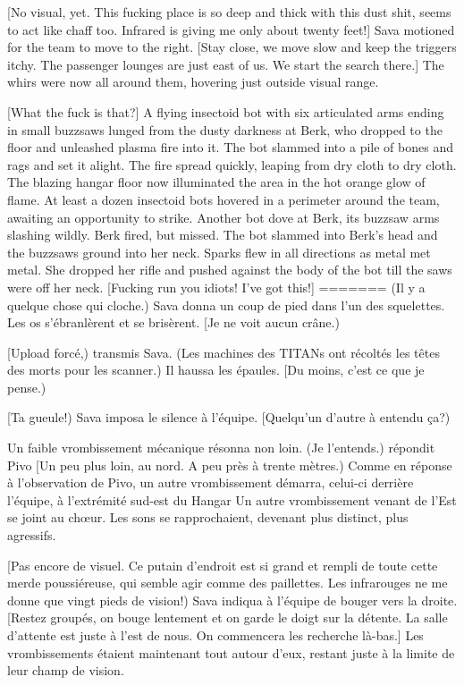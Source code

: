[No visual, yet. This fucking place is so deep and thick with this dust shit, seems to act like chaff too. Infrared is giving me only about twenty feet!] Sava motioned for the team to move to the right. [Stay close, we move slow and keep the triggers itchy. The passenger lounges are just east of us. We start the search there.] The whirs were now all around them, hovering just outside visual range. 

[What the fuck is that?] A flying insectoid bot with six articulated arms ending in small buzzsaws lunged from the dusty darkness at Berk, who dropped to the floor and unleashed plasma fire into it. The bot slammed into a pile of bones and rags and set it alight. The fire spread quickly, leaping from dry cloth to dry cloth. The blazing hangar floor now illuminated the area in the hot orange glow of flame. At least a dozen insectoid bots hovered in a perimeter around the team, awaiting an opportunity to strike. Another bot dove at Berk, its buzzsaw arms slashing wildly. Berk fired, but missed. The bot slammed into Berk's head and the buzzsaws ground into her neck. Sparks flew in all directions as metal met metal. She dropped her rifle and pushed against the body of the bot till the saws were off her neck. [Fucking run you idiots! I've got this!] 
=======
(Il y a quelque chose qui cloche.) Sava donna un coup de pied dans l'un des squelettes. Les os s'ébranlèrent et se brisèrent. [Je ne voit aucun crâne.) 

[Upload forcé,) transmis Sava. (Les machines des TITANs ont récoltés les têtes des morts pour les scanner.) Il haussa les épaules. [Du moins, c'est ce que je pense.) 

[Ta gueule!) Sava imposa le silence à l'équipe. [Quelqu'un d'autre à entendu ça?) 

Un faible vrombissement mécanique résonna non loin. (Je l'entends.) répondit Pivo [Un peu plus loin, au nord. A peu près à trente mètres.) Comme en réponse à l'observation de Pivo, un autre vrombissement démarra, celui-ci derrière l'équipe, à l'extrémité sud-est du Hangar Un autre vrombissement venant de l'Est se joint au chœur. Les sons se rapprochaient, devenant plus distinct, plus agressifs. 

[Pas encore de visuel. Ce putain d'endroit est si grand et rempli de toute cette merde poussiéreuse, qui semble agir comme des paillettes. Les infrarouges ne me donne que vingt pieds de vision!) Sava indiqua à l'équipe de bouger vers la droite. [Restez groupés, on bouge lentement et on garde le doigt sur la détente. La salle d'attente est juste à l'est de nous. On commencera les recherche là-bas.] Les vrombissements étaient maintenant tout autour d'eux, restant juste à la limite de leur champ de vision. 

